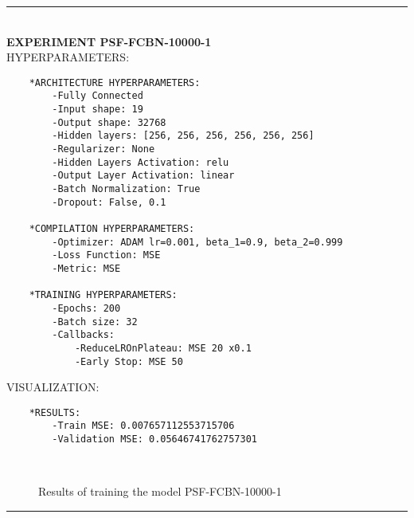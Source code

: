 \rule{0.5\textwidth}{0.5pt}\\

	{\large \textbf{EXPERIMENT PSF-FCBN-10000-1}}\\
	
	{\normalsize HYPERPARAMETERS:}
	\begin{lstlisting}	
	*ARCHITECTURE HYPERPARAMETERS:
		-Fully Connected
		-Input shape: 19
		-Output shape: 32768
		-Hidden layers: [256, 256, 256, 256, 256, 256]
		-Regularizer: None
		-Hidden Layers Activation: relu
		-Output Layer Activation: linear
		-Batch Normalization: True
		-Dropout: False, 0.1
	
	*COMPILATION HYPERPARAMETERS:
		-Optimizer: ADAM lr=0.001, beta_1=0.9, beta_2=0.999
		-Loss Function: MSE
		-Metric: MSE
	
	*TRAINING HYPERPARAMETERS:
		-Epochs: 200
		-Batch size: 32
		-Callbacks: 
			-ReduceLROnPlateau: MSE 20 x0.1
			-Early Stop: MSE 50
	\end{lstlisting}
	
	{\normalsize VISUALIZATION:}
	\begin{lstlisting}
	*RESULTS:
        -Train MSE: 0.007657112553715706
        -Validation MSE: 0.05646741762757301
	\end{lstlisting}
	
	\begin{figure*}[ht!]
		\hspace{\fill}
		\hspace{\fill}
		\\
		\caption{Results of training the model PSF-FCBN-10000-1}
	\end{figure*}
	
\FloatBarrier	
\rule{0.5\textwidth}{0.5pt}\\